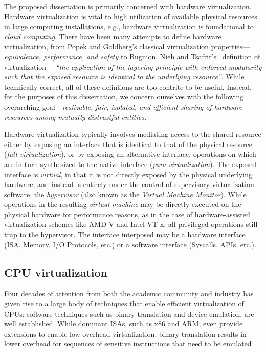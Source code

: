 The proposed dissertation is primarily concerned with hardware virtualization.
Hardware virtualization is vital to high utilization of available physical
resources in large computing installations, e.g., hardware virtualization is
foundational to \textit{cloud computing}.
There have been many attempts to define hardware virtualization, from Popek
and Goldberg's classical virtualization properties---\emph{equivalence,
performance, and safety} to Bugnion, Nieh and
Tsafrir's~\cite{bugnion-nieh-tsafrir} definition of virtualization---%
\textit{``the application of the layering principle with
enforced modularity such that the exposed resource is identical to the
underlying resource''}. While technically correct, all of these defintions are
too contrite to be useful. Instead, for the purposes of this dissertation, we
concern ourselves with the following overarching goal---\emph{realizable,
fair, isolated, and efficient sharing of hardware resources among mutually
distrustful entities.}

Hardware virtualization typically involves mediating access to the shared
resource either by exposing an interface that is identical to that of the
physical resource (\emph{full-virtualization}), or by exposing an alternative
interface, operations on which are in-turn synthesized to the native interface
(\emph{para-virtualization}).
The exposed interface is \emph{virtual}, in that it is not directly exposed by
the physical underlying hardware, and instead is entirely under the control of
supervisory virtualization software, the \emph{hypervisor} (also known as the
\emph{Virtual Machine Monitor}). While operations in the resulting \emph{
virtual machine} may be directly executed on the physical hardware for
performance reasons, as in the case of hardware-assisted virtualization
schemes like AMD-V and Intel VT-x, all privileged operations still trap to the
hypervisor. The interface interposed may be a hardware interface (ISA, Memory,
I/O Protocols, etc.) or a software interface (Syscalls, APIs, etc.).

\subsection{CPU virtualization}

Four decades of attention from both the academic community and industry has
given rise to a large body of techniques that enable efficient virtualization
of CPUs: software techniques such as binary translation and device emulation,
are well established. While dominant ISAs, such as x86 and ARM, even provide
extensions to enable low-overhead virtualization, binary translation results
in lower overhead for sequences of sensitive instructions that need to be
emulated~\cite{vmware-esx-bt-plus-vtx}.

